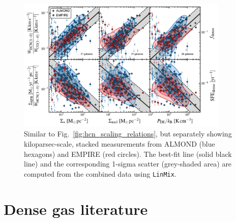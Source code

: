 \documentclass[letter, longauth]{aa} %
\begin{document}
\begin{appendix}
\begin{figure}
\centering
\includegraphics[width=0.9\textwidth]{Figures/HCN_scaling_relations_empire_vs_almond_compressed_v2.pdf}
\caption{Similar to Fig.~\ref{fig:hcn_scaling_relations}, but separately showing kiloparsec-scale, stacked measurements from ALMOND (blue hexagons) and EMPIRE (red circles).
The best-fit line (solid black line) and the corresponding 1-sigma scatter (grey-shaded area) are computed from the combined data using \texttt{LinMix}.
}
\label{fig:hcn_scaling_relations_almond_vs_empire}
\end{figure}


\section{Dense gas literature}
\label{sec:app:literature}


\end{appendix}
\end{document}
